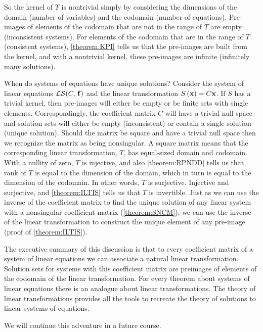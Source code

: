 \documentclass{ximera}
\begin{document}
So the kernel of $T$ is nontrivial simply by considering the dimensions of the domain (number of variables) and the codomain (number of equations).  Pre-images of elements of the codomain that are not in the range of $T$ are empty (inconsistent systems).  For elements of the codomain that are in the range of $T$ (consistent systems), \ref{theorem:KPI} tells us that the pre-images are built from the kernel, and with a nontrivial kernel, these pre-images are infinite (infinitely many solutions).



When do systems of equations have unique solutions?  Consider the system of linear equations $\mathcal{LS}\!\left(C,\,\mathbf{f}\right)$ and the linear transformation $S\left(\mathbf{x}\right)=C\mathbf{x}$.  If $S$ has a trivial kernel, then pre-images will either be empty or be finite sets with single elements.  Correspondingly, the coefficient matrix $C$ will have a trivial null space and solution sets will either be empty (inconsistent) or contain a single solution (unique solution).  Should the matrix be square and have a trivial null space then we recognize the matrix as being nonsingular.  A square matrix means that the corresponding linear transformation, $T$, has equal-sized domain and codomain.  With a nullity of zero, $T$ is injective, and also \ref{theorem:RPNDD} tells us that rank of $T$ is equal to the dimension of the domain, which in turn is equal to the dimension of the codomain.  In other words, $T$ is surjective.  Injective and surjective, and \ref{theorem:ILTIS} tells us that $T$ is invertible.  Just as we can use the inverse of the coefficient matrix to find the unique solution of any linear system with a nonsingular coefficient matrix (\ref{theorem:SNCM}), we can use the inverse of the linear transformation to construct the unique element of any pre-image (proof of \ref{theorem:ILTIS}).



The executive summary of this discussion is that to every coefficient matrix of a system of linear equations we can associate a natural linear transformation.  Solution sets for systems with this coefficient matrix are preimages of elements of the codomain of the linear transformation.  For every theorem about systems of linear equations there is an analogue about linear transformations.  The theory of linear transformations provides all the tools to recreate the theory of solutions to linear systems of equations.



We will continue this adventure in a future course.
\end{document}
